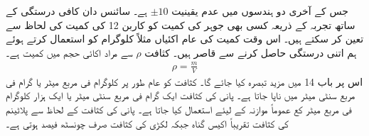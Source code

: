 جس کے آخری دو ہندسوں میں عدم یقینیت $\pm 10$ ہے۔ سائنس دان کافی درستگی کے ساتھ تجربہ کے ذریعہ کسی بھی جوہر کی کمیت کو کاربن 12 کی کمیت کی لحاظ سے تعین کر سکتے ہیں۔ اس وقت کمیت کی عام اکئیاں مثلاً کلوگرام کو استعمال کرتے ہوئے ہم اتنی درستگی حاصل کرنے سے قاصر ہیں۔
کثافت $\rho$ سے مراد  اکائی حجم میں کمیت ہے۔
\begin{align}
	\rho = \frac{m}{V}
\end{align}
اس پر باب 14 میں مزید تبصرہ کیا جائے گا۔ کثافت کو عام طور پر کلوگرام فی مربع میٹر یا گرام فی مربع سنٹی میٹر میں ناپا جاتا ہے۔ پانی کی کثافت ایک گرام فی مربع سنٹی میٹر یا ایک ہزار کلوگرام فی مربع میٹر کع عموماً موازنہ کے لیئے استعمال کیا جاتا ہے۔ پانی کی کثافت کے لحاظ سے پلاٹینم کی کثافت تقریباً اکیس گناہ جبکہ لکڑی کی کثافت صرف چونسٹھ فیصد ہوتی ہے۔

